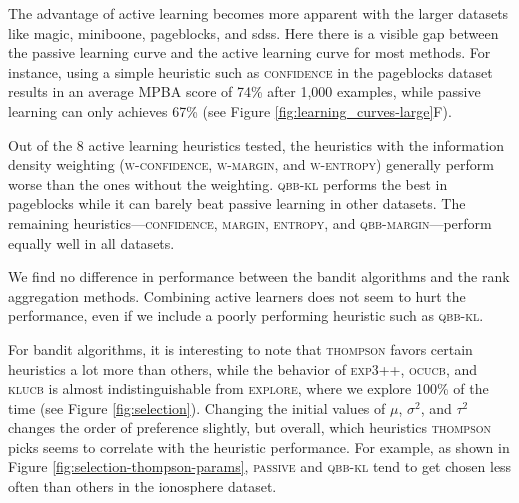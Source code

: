 \documentclass[fleqn,10pt,lineno]{wlpeerj} %
\begin{document}
The advantage of active learning becomes more apparent with the larger datasets
like magic, miniboone, pageblocks, and sdss. Here there is a visible gap
between the passive learning curve and the active learning curve for most
methods. For instance, using a simple heuristic such as \textsc{confidence} in
the pageblocks dataset results in an average MPBA score of 74\% after 1,000
examples, while passive learning can only achieves 67\% (see Figure
\ref{fig:learning_curves-large}F).


Out of the 8 active learning heuristics tested, the heuristics with the
information density weighting (\textsc{w-confidence}, \textsc{w-margin}, and
\textsc{w-entropy}) generally perform worse than the ones without the
weighting. \textsc{qbb-kl} performs the best in pageblocks while it can barely
beat passive learning in other datasets. The remaining
heuristics---\textsc{confidence}, \textsc{margin}, \textsc{entropy}, and
\textsc{qbb-margin}---perform equally well in all datasets.

We find no difference in performance between the bandit algorithms and
the rank aggregation methods. Combining active learners does not seem
to hurt the performance, even if we include a poorly performing heuristic
such as \textsc{qbb-kl}.

For bandit algorithms, it is interesting to note that \textsc{thompson} favors
certain heuristics a lot more than others, while the behavior of
\textsc{exp3++}, \textsc{ocucb}, and \textsc{klucb} is almost indistinguishable
from \textsc{explore}, where we explore 100\% of the time (see Figure
\ref{fig:selection}). Changing the initial values of $\mu$, $\sigma^2$, and
$\tau^2$ changes the order of preference slightly, but overall, which
heuristics \textsc{thompson} picks seems to correlate with the heuristic
performance. For example, as shown in Figure
\ref{fig:selection-thompson-params}, \textsc{passive}
and \textsc{qbb-kl} tend to get chosen less often than others in the ionosphere
dataset.
\end{document}
